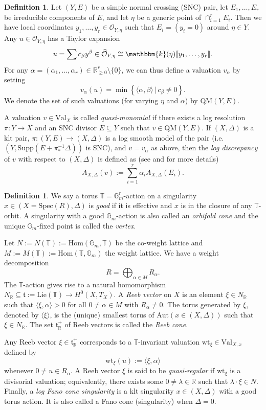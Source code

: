 \documentclass[12pt]{amsart}
\theoremstyle{definition}
\newtheorem{defn}[prop]{Definition}
\newcommand{\bR}{\mathbb{R}}
\newcommand{\bT}{\mathbb{T}}
\newcommand{\bG}{\mathbb{G}}
\newcommand{\bk}{\mathbbm{k}}
\newcommand{\cO}{\mathcal{O}}
\newcommand{\ft}{\mathfrak{t}}
\newcommand{\Spec}{\mathrm{Spec}}
\newcommand{\Supp}{\mathrm{Supp}}
\newcommand{\Hom}{\mathrm{Hom}}
\newcommand{\Aut}{\mathrm{Aut}}
\newcommand{\Val}{\mathrm{Val}}
\newcommand{\Lie}{\mathrm{Lie}}
\newcommand{\QM}{\mathrm{QM}}
\newcommand{\wt}{\mathrm{wt}}
\numberwithin{equation}{section}
\begin{document}
\begin{defn}
Let $(Y,E)$ be a simple normal crossing (SNC) pair, let $E_1,\dots,E_r$ be irreducible components of $E$, and let $\eta$ be a generic point of $\cap_{i=1}^r E_i$. Then we have local coordinates $y_1,\dots,y_r\in \cO_{Y,\eta}$ such that $E_i=(y_i=0)$ around $\eta\in Y$. Any $u\in \cO_{Y,\eta}$ has a Taylor expansion
\[
u=\sum c_{\beta}y^{\beta} \in \widehat{\mathcal{O}}_{Y,\eta}\cong \bk(\eta)[\![y_1,\dots,y_r ]\!].
\]
For any $\alpha=(\alpha_1,\dots,\alpha_r)\in \bR_{\ge 0}^r\setminus\{0\}$, we can thus define a valuation $v_{\alpha}$ by setting
\[
v_{\alpha}(u)=\min \left\{\langle \alpha,\beta \rangle \,|\, c_{\beta}\neq 0\right\}.
\]
We denote the set of such valuations (for varying $\eta$ and $\alpha$) by $\QM(Y,E)$. %

A valuation $v\in \Val_X$ is called \emph{quasi-monomial} if there exists a log resolution $\pi\colon Y\to X$ and an SNC divisor $E\subseteq Y$ such that $v\in \QM(Y,E)$. If $(X,\Delta)$ is a klt pair, $\pi\colon (Y,E)\to (X,\Delta)$ is a log smooth model of the pair (i.e. $(Y,\Supp(E+\pi_*^{-1}\Delta))$ is SNC), and $v=v_\alpha$ as above, then the \emph{log discrepancy} of $v$ with respect to $(X,\Delta)$ is defined as (see \cite[Section 5]{JM-val-ideal-seq} and \cite[Section 3]{BdFFU-log-discrepancy} for more details) 
\[
A_{X,\Delta}(v) := \sum_{i=1}^r \alpha_i A_{X,\Delta}(E_i).
\]
\end{defn}

\begin{defn} \label{def:Reeb vector}
We say a torus $\bT=\bG_m^r$-action on a singularity $x\in (X=\Spec(R),\Delta)$ is {\it good} if it is effective and $x$ is in the closure of any $\bT$-orbit. A singularity with a good $\bG_m$-action is also called an \emph{orbifold cone} and the unique $\bG_m$-fixed point is called the \emph{vertex}.

Let $N:=N(\bT):=\Hom(\bG_m, \bT)$ be the co-weight lattice and $M:=M(\bT):=\Hom(\bT,\bG_m)$ the weight lattice. We have a weight decomposition 
\[
R=\bigoplus_{\alpha\in M} R_\alpha.
\]
The $\bT$-action gives rise to a natural homomorphism $N_\bR \subseteq \ft:=\Lie(\bT)\to H^0(X,T_X)$. A \emph{Reeb vector} on $X$ is an element $\xi\in N_\bR$ such that $\langle \xi, \alpha \rangle>0$ for all $0\neq \alpha\in M$ with $R_{\alpha}\neq 0$. The torus generated by $\xi$, denoted by $\langle\xi\rangle$, is the (unique) smallest torus of $\Aut(x\in (X,\Delta))$ such that $\xi\in N_\bR$. The set $\ft^+_{\bR}$ of Reeb vectors is called the \emph{Reeb cone}. 

Any Reeb vector $\xi\in \ft^+_{\bR}$ corresponds to a $\bT$-invariant valuation $\wt_\xi\in \Val_{X,x}$ defined by
\[
\wt_\xi (u):=\langle \xi, \alpha \rangle
\]
whenever $0\neq u\in R_\alpha$. A Reeb vector $\xi$ is said to be \emph{quasi-regular} if $\wt_\xi$ is a divisorial valuation; equivalently, there exists some $0\neq \lambda\in \bR$ such that $\lambda\cdot \xi\in N$. Finally, a \emph{log Fano cone singularity} is a klt singularity $x\in (X,\Delta)$ with a good torus action. It is also called a Fano cone (singularity) when $\Delta=0$.
\end{defn}
\end{document}
